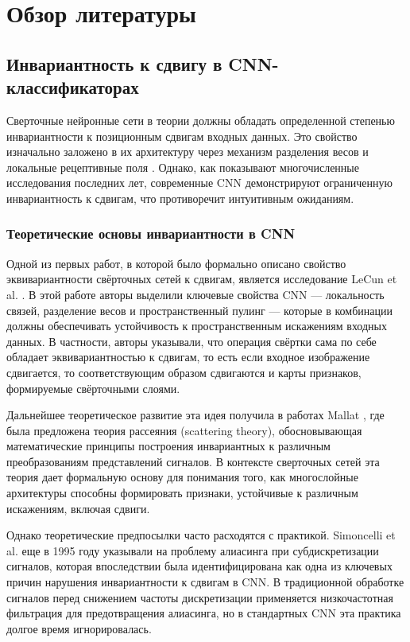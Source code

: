 \section{Обзор литературы} 
\label{review}

\subsection{Инвариантность к сдвигу в CNN-классификаторах}
\label{review:invariance}

Сверточные нейронные сети в теории должны обладать определенной степенью инвариантности к позиционным сдвигам входных данных. Это свойство изначально заложено в их архитектуру через механизм разделения весов и локальные рецептивные поля \cite{Zhang2019blurpool}. Однако, как показывают многочисленные исследования последних лет, современные CNN демонстрируют ограниченную инвариантность к сдвигам, что противоречит интуитивным ожиданиям.

\subsubsection{Теоретические основы инвариантности в CNN}
\label{review:invariance:theory}

Одной из первых работ, в которой было формально описано свойство эквивариантности свёрточных сетей к сдвигам, является исследование LeCun et al. \cite{Zhang2019blurpool}. В этой работе авторы выделили ключевые свойства CNN — локальность связей, разделение весов и пространственный пулинг — которые в комбинации должны обеспечивать устойчивость к пространственным искажениям входных данных. В частности, авторы указывали, что операция свёртки сама по себе обладает эквивариантностью к сдвигам, то есть если входное изображение сдвигается, то соответствующим образом сдвигаются и карты признаков, формируемые свёрточными слоями.

Дальнейшее теоретическое развитие эта идея получила в работах Mallat \cite{he2016deep}, где была предложена теория рассеяния (scattering theory), обосновывающая математические принципы построения инвариантных к различным преобразованиям представлений сигналов. В контексте сверточных сетей эта теория дает формальную основу для понимания того, как многослойные архитектуры способны формировать признаки, устойчивые к различным искажениям, включая сдвиги.

Однако теоретические предпосылки часто расходятся с практикой. Simoncelli et al. \cite{simonyan2015deep} еще в 1995 году указывали на проблему алиасинга при субдискретизации сигналов, которая впоследствии была идентифицирована как одна из ключевых причин нарушения инвариантности к сдвигам в CNN. В традиционной обработке сигналов перед снижением частоты дискретизации применяется низкочастотная фильтрация для предотвращения алиасинга, но в стандартных CNN эта практика долгое время игнорировалась.

